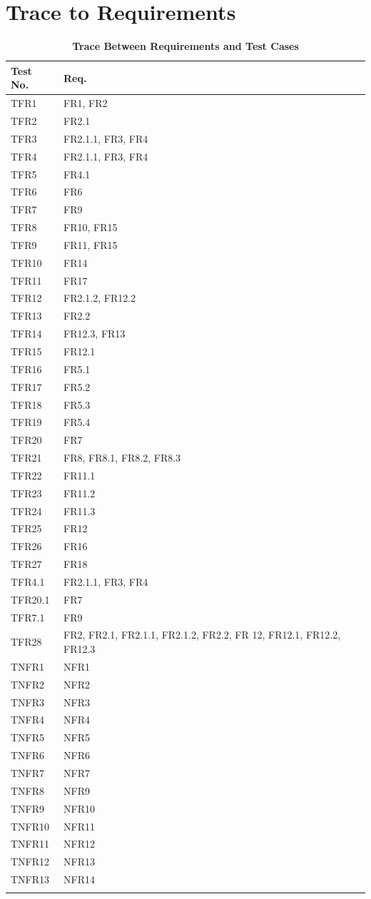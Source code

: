\documentclass[12pt, titlepage]{article}
\begin{document}
\section{Trace to Requirements}
\begin{longtable}{p{} p{}}
\toprule
\textbf{Test No.} & \textbf{Req.}\\
\midrule
TFR1 & FR1, FR2\\
TFR2 & FR2.1\\
TFR3 & FR2.1.1, FR3, FR4\\
TFR4 & FR2.1.1, FR3, FR4\\
TFR5 & FR4.1\\
TFR6 & FR6\\
TFR7 & FR9\\
TFR8 & FR10, FR15\\
TFR9 & FR11, FR15\\
TFR10 & FR14\\
TFR11 & FR17\\
TFR12 & FR2.1.2, FR12.2\\
TFR13 & FR2.2\\
TFR14 & FR12.3, FR13\\
TFR15 & FR12.1\\
TFR16 & FR5.1\\
TFR17 & FR5.2\\
TFR18 & FR5.3\\
TFR19 & FR5.4\\
TFR20 & FR7\\
TFR21 & FR8, FR8.1, FR8.2, FR8.3\\
TFR22 & FR11.1\\
TFR23 & FR11.2\\
TFR24 & FR11.3\\
TFR25 & FR12\\
TFR26 & FR16\\
TFR27 & FR18\\
TFR4.1 & FR2.1.1, FR3, FR4\\
TFR20.1 & FR7\\
TFR7.1 & FR9\\
TFR28 & FR2, FR2.1, FR2.1.1, FR2.1.2, FR2.2, FR 12, FR12.1, FR12.2, FR12.3\\
TNFR1 & NFR1\\
TNFR2 & NFR2\\
TNFR3 & NFR3\\
TNFR4 & NFR4\\
TNFR5 & NFR5\\
TNFR6 & NFR6\\
TNFR7 & NFR7\\
TNFR8 & NFR9\\
TNFR9 & NFR10\\
TNFR10 & NFR11\\
TNFR11 & NFR12\\
TNFR12 & NFR13\\
TNFR13 & NFR14\\
\bottomrule
\caption{\bf Trace Between Requirements and Test Cases}
\label{TblRT}
\end{longtable}
\end{document}
